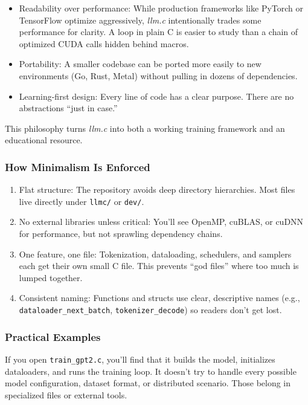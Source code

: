 \documentclass[
  letterpaper,
  DIV=11,
  numbers=noendperiod]{scrreprt}
\providecommand{\tightlist}{%
  \setlength{\itemsep}{0pt}\setlength{\parskip}{0pt}}
\begin{document}
\begin{itemize}
\tightlist
\item
  Readability over performance: While production frameworks like PyTorch
  or TensorFlow optimize aggressively, \emph{llm.c} intentionally trades
  some performance for clarity. A loop in plain C is easier to study
  than a chain of optimized CUDA calls hidden behind macros.
\item
  Portability: A smaller codebase can be ported more easily to new
  environments (Go, Rust, Metal) without pulling in dozens of
  dependencies.
\item
  Learning-first design: Every line of code has a clear purpose. There
  are no abstractions ``just in case.''
\end{itemize}

This philosophy turns \emph{llm.c} into both a working training
framework and an educational resource.

\subsubsection{How Minimalism Is
Enforced}\label{how-minimalism-is-enforced}

\begin{enumerate}
\def\labelenumi{\arabic{enumi}.}
\tightlist
\item
  Flat structure: The repository avoids deep directory hierarchies. Most
  files live directly under \texttt{llmc/} or \texttt{dev/}.
\item
  No external libraries unless critical: You'll see OpenMP, cuBLAS, or
  cuDNN for performance, but not sprawling dependency chains.
\item
  One feature, one file: Tokenization, dataloading, schedulers, and
  samplers each get their own small C file. This prevents ``god files''
  where too much is lumped together.
\item
  Consistent naming: Functions and structs use clear, descriptive names
  (e.g., \texttt{dataloader\_next\_batch}, \texttt{tokenizer\_decode})
  so readers don't get lost.
\end{enumerate}

\subsubsection{Practical Examples}\label{practical-examples}

If you open \texttt{train\_gpt2.c}, you'll find that it builds the
model, initializes dataloaders, and runs the training loop. It doesn't
try to handle every possible model configuration, dataset format, or
distributed scenario. Those belong in specialized files or external
tools.
\end{document}
